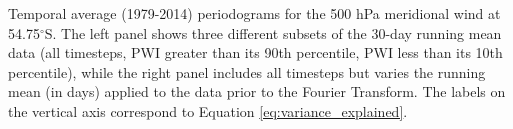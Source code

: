 \label{fig:periodograms}
Temporal average (1979-2014) periodograms for the 500 hPa meridional wind at 54.75$^{\circ}$S. The left panel shows three different subsets of the 30-day running mean data (all timesteps, PWI greater than its 90th percentile, PWI less than its 10th percentile), while the right panel includes all timesteps but varies the running mean (in days) applied to the data prior to the Fourier Transform. The labels on the vertical axis correspond to Equation \ref{eq:variance_explained}. 